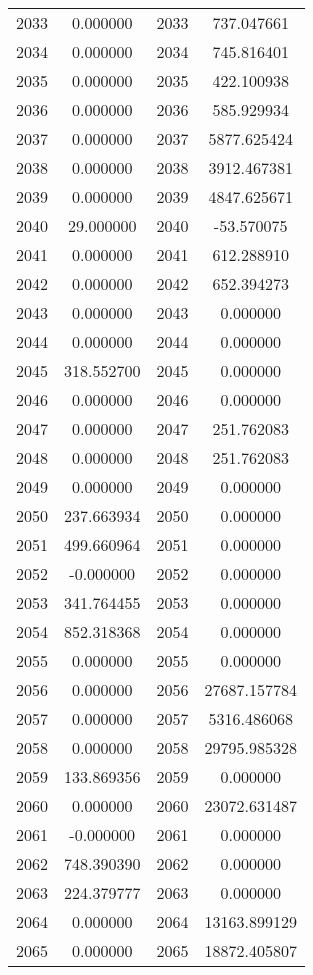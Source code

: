 \documentclass[12pt]{article}
\begin{document}
\begin{longtable}{@{}cccc@{}}
2033 & 0.000000 & 2033 & 737.047661 \\
2034 & 0.000000 & 2034 & 745.816401 \\
2035 & 0.000000 & 2035 & 422.100938 \\
2036 & 0.000000 & 2036 & 585.929934 \\
2037 & 0.000000 & 2037 & 5877.625424 \\
2038 & 0.000000 & 2038 & 3912.467381 \\
2039 & 0.000000 & 2039 & 4847.625671 \\
2040 & 29.000000 & 2040 & -53.570075 \\
2041 & 0.000000 & 2041 & 612.288910 \\
2042 & 0.000000 & 2042 & 652.394273 \\
2043 & 0.000000 & 2043 & 0.000000 \\
2044 & 0.000000 & 2044 & 0.000000 \\
2045 & 318.552700 & 2045 & 0.000000 \\
2046 & 0.000000 & 2046 & 0.000000 \\
2047 & 0.000000 & 2047 & 251.762083 \\
2048 & 0.000000 & 2048 & 251.762083 \\
2049 & 0.000000 & 2049 & 0.000000 \\
2050 & 237.663934 & 2050 & 0.000000 \\
2051 & 499.660964 & 2051 & 0.000000 \\
2052 & -0.000000 & 2052 & 0.000000 \\
2053 & 341.764455 & 2053 & 0.000000 \\
2054 & 852.318368 & 2054 & 0.000000 \\
2055 & 0.000000 & 2055 & 0.000000 \\
2056 & 0.000000 & 2056 & 27687.157784 \\
2057 & 0.000000 & 2057 & 5316.486068 \\
2058 & 0.000000 & 2058 & 29795.985328 \\
2059 & 133.869356 & 2059 & 0.000000 \\
2060 & 0.000000 & 2060 & 23072.631487 \\
2061 & -0.000000 & 2061 & 0.000000 \\
2062 & 748.390390 & 2062 & 0.000000 \\
2063 & 224.379777 & 2063 & 0.000000 \\
2064 & 0.000000 & 2064 & 13163.899129 \\
2065 & 0.000000 & 2065 & 18872.405807 \\

\end{longtable}
\end{document}
